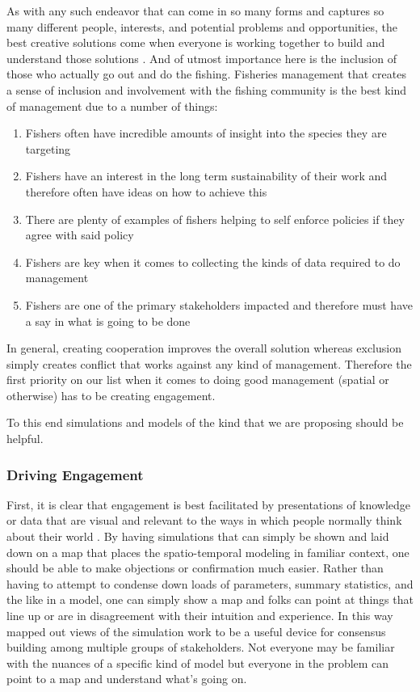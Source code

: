 \documentclass[11pt]{article}
\begin{document}
As with any such endeavor that can come in so many forms and captures so many different people, interests, and potential problems and opportunities, the best creative solutions come when everyone is working together to build and understand those solutions \cite{prince2010} \cite{waltersmartell}. And of utmost importance here is the inclusion of those who actually go out and do the fishing. Fisheries management that creates a sense of inclusion and involvement with the fishing community is the best kind of management due to a number of things:

\begin{enumerate}
\item Fishers often have incredible amounts of insight into the species they are targeting 
\item Fishers have an interest in the long term sustainability of their work and therefore often have ideas on how to achieve this
\item There are plenty of examples of fishers helping to self enforce policies if they agree with said policy
\item Fishers are key when it comes to collecting the kinds of data required to do management
\item Fishers are one of the primary stakeholders impacted and therefore must have a say in what is going to be done
\end{enumerate}

In general, creating cooperation improves the overall solution whereas exclusion simply creates conflict that works against any kind of management. Therefore the first priority on our list when it comes to doing good management (spatial or otherwise) has to be creating engagement. \newline

To this end simulations and models of the kind that we are proposing should be helpful. 

\subsubsection{Driving Engagement}

First, it is clear that engagement is best facilitated by presentations of knowledge or data that are visual and relevant to the ways in which people normally think about their world \cite{prince2010} \cite{lorenzen2010}. By having simulations that can simply be shown and laid down on a map that places the spatio-temporal modeling in familiar context, one should be able to make objections or confirmation much easier. Rather than having to attempt to condense down loads of parameters, summary statistics, and the like in a model, one can simply show a map and folks can point at things that line up or are in disagreement with their intuition and experience. In this way mapped out views of the simulation work to be a useful device for consensus building among multiple groups of stakeholders. Not everyone may be familiar with the nuances of a specific kind of model but everyone in the problem can point to a map and understand what's going on. 
\newline
\end{document}

